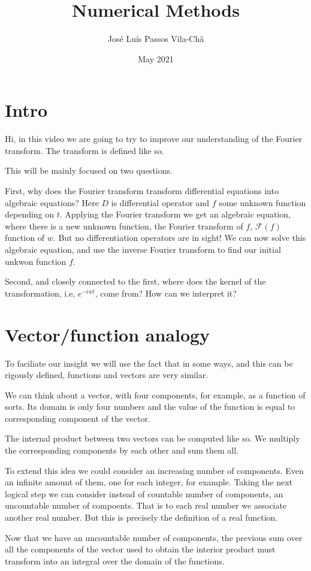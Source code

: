 \documentclass{article}
\title{Numerical Methods}
\author{José Luís Passos Vila-Chã}
\date{May 2021}
\begin{document}
\section{Intro}

Hi, in this video we are going to try to improve our understanding of the Fourier transform.
The transform is defined like so.

This will be mainly focused on two questions.

First, why does the Fourier transform transform differential equations into algebraic equations?
Here $D$ is differential operator and $f$ some unknown function depending on $t$.
Applying the Fourier transform we get an algebraic equation, where there is a new unknown function, the Fourier transform of $f$,
$\mathcal F(f)$ function of $w$.
But no differentiation operators are in sight!
We can now solve this algebraic equation, and use the inverse Fourier transform to find our initial unkwon function $f$.

Second, and closely connected to the first, where does the kernel of the transformation, i.e, $e^{-iwt}$, come from?
How can we interpret it?

\section{Vector/function analogy}

To faciliate our insight we will use the fact that in some ways, and this can be rigously defined,  functions and vectors are very similar.

We can think about a vector, with four components, for example, as a function of sorts.
Its domain is only four numbers and the value of the function is equal to corresponding component of the vector.

The internal product between two vectors can be computed like so.
We multiply the corresponding components by each other and sum them all.

To extend this idea we could consider an increasing number of components.
Even an infinite amount of them, one for each integer, for example.
Taking the next logical step we can consider instead of countable number of components, an uncountable number of compoents.
That is to each real number we associate another real number.
But this is precisely the definition of a real function.

Now that we have an uncountable number of components, the previous sum over all the components of the vector used to obtain the interior product must transform into an integral over the domain of the functions.
\end{document}
